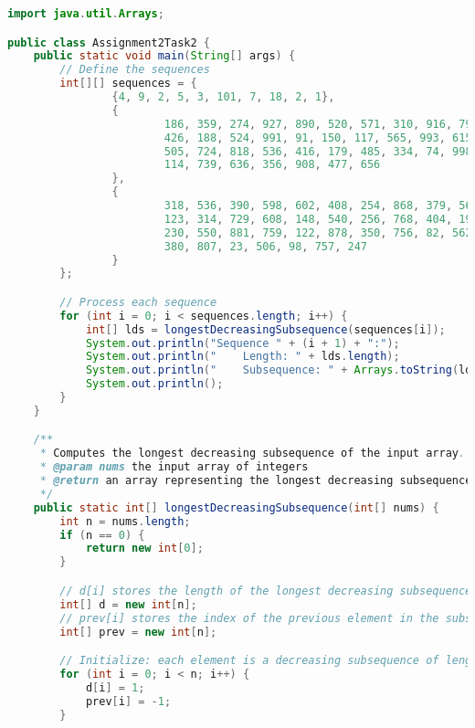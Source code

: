 \documentclass[12pt,letterpaper,final]{report}
\begin{document}
\begin{lstlisting}[language=Java]
import java.util.Arrays;

public class Assignment2Task2 {
    public static void main(String[] args) {
        // Define the sequences
        int[][] sequences = {
                {4, 9, 2, 5, 3, 101, 7, 18, 2, 1},
                {
                        186, 359, 274, 927, 890, 520, 571, 310, 916, 798, 732, 23, 196, 579,
                        426, 188, 524, 991, 91, 150, 117, 565, 993, 615, 48, 811, 594, 303, 191,
                        505, 724, 818, 536, 416, 179, 485, 334, 74, 998, 100, 197, 768, 421,
                        114, 739, 636, 356, 908, 477, 656
                },
                {
                        318, 536, 390, 598, 602, 408, 254, 868, 379, 565, 206, 619, 936, 195,
                        123, 314, 729, 608, 148, 540, 256, 768, 404, 190, 559, 1000, 482, 141, 26,
                        230, 550, 881, 759, 122, 878, 350, 756, 82, 562, 897, 508, 853, 317,
                        380, 807, 23, 506, 98, 757, 247
                }
        };

        // Process each sequence
        for (int i = 0; i < sequences.length; i++) {
            int[] lds = longestDecreasingSubsequence(sequences[i]);
            System.out.println("Sequence " + (i + 1) + ":");
            System.out.println("    Length: " + lds.length);
            System.out.println("    Subsequence: " + Arrays.toString(lds));
            System.out.println();
        }
    }

    /**
     * Computes the longest decreasing subsequence of the input array.
     * @param nums the input array of integers
     * @return an array representing the longest decreasing subsequence
     */
    public static int[] longestDecreasingSubsequence(int[] nums) {
        int n = nums.length;
        if (n == 0) {
            return new int[0];
        }

        // d[i] stores the length of the longest decreasing subsequence ending at index i.
        int[] d = new int[n];
        // prev[i] stores the index of the previous element in the subsequence ending at index i.
        int[] prev = new int[n];

        // Initialize: each element is a decreasing subsequence of length 1, and no predecessor.
        for (int i = 0; i < n; i++) {
            d[i] = 1;
            prev[i] = -1;
        }


\end{lstlisting}
\end{document}
